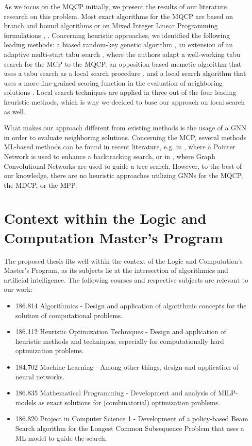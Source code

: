 \documentclass [11pt]{article}
\begin{document}
As we focus on the MQCP initially, we present the results of our literature research on this problem. Most exact algorithms for the MQCP are based on branch and bound algorithms \cite{mahdavi2014branch} or on Mixed Integer Linear Programming formulations \cite{ribeiro_exact_2019}, \cite{Marinelli2021}. Concerning heuristic approaches, we identified the following leading methods: a biased random-key genetic algorithm \cite{pinto_biased_2018}, an extension of an adaptive multi-start tabu search \cite{djeddi_extension_2019}, where the authors adapt a well-working tabu search for the MCP to the MQCP, an opposition based memetic algorithm that uses a tabu search as a local search procedure \cite{zhou_opposition-based_2020}, and a local search algorithm that uses a more fine-grained scoring function in the evaluation of neighboring solutions \cite{chen_nuqclq_2021}. Local search techniques are applied in three out of the four leading heuristic methods, which is why we decided to base our approach on local search as well.  

What makes our approach different from existing methods is the usage of a GNN in order to evaluate neighboring solutions. Concerning the MCP, several methods ML-based methods can be found in recent literature, e.g. in \cite{Gu2020}, where a Pointer Network is used to enhance a backtracking search, or in \cite{Li2018}, where Graph Convolutional Networks are used to guide a tree search. However, to the best of our knowledge, there are no heuristic approaches utilizing GNNs for the MQCP, the MDCP, or the MPP. 

\section{Context within the Logic and Computation Master's Program}

The proposed thesis fits well within the context of the Logic and Computation's Master's Program, as its subjects lie at the intersection of algorithmics and artificial intelligence. The following courses and respective subjects are relevant to our work:
\begin{itemize}
	\item 186.814 Algorithmics - Design and application of algorithmic concepts for the solution of computational problems. 
	\item 186.112 Heuristic Optimization Techniques - Design and application of heuristic methods and techniques, especially for computationally hard optimization problems.
	\item 184.702 Machine Learning - Among other things, design and application of neural networks.
	\item 186.835 Mathematical Programming - Development and analysis of MILP-models as exact solutions for (combinatorial) optimization problems.
	\item 186.820 Project in Computer Science 1 - Development of a policy-based Beam Search algorithm for the Longest Common Subsequence Problem that uses a ML model to guide the search. 
\end{itemize}

 

\end{document}
